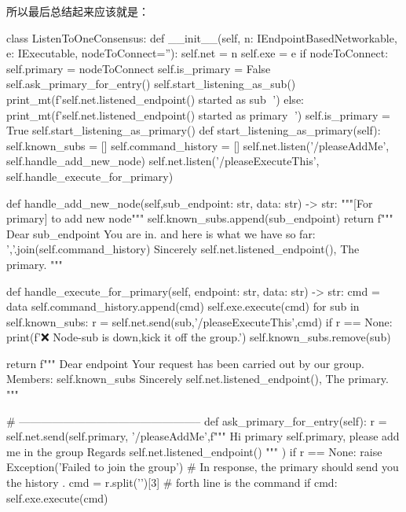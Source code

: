 所以最后总结起来应该就是：
\begin{simplepy}
class ListenToOneConsensus:
    def __init__(self,
                 n: IEndpointBasedNetworkable,
                 e: IExecutable,
                 nodeToConnect=''):
        self.net = n
        self.exe = e
        if nodeToConnect:
            self.primary = nodeToConnect
            self.is_primary = False
            self.ask_primary_for_entry()
            self.start_listening_as_sub()
            print_mt(f'{self.net.listened_endpoint()} started as sub 🐸')
        else:
            print_mt(f'{self.net.listened_endpoint()} started as primary 🐸')
            self.is_primary = True
            self.start_listening_as_primary()
    def start_listening_as_primary(self):
        self.known_subs = []
        self.command_history = []
        self.net.listen('/pleaseAddMe',
                        self.handle_add_new_node)
        self.net.listen('/pleaseExecuteThis',
                        self.handle_execute_for_primary)

    def handle_add_new_node(self,sub_endpoint: str,
                            data: str) -> str:
        """[For primary] to add new node"""
        self.known_subs.append(sub_endpoint)
        return f"""
        Dear {sub_endpoint}
            You are in. and here is what we have so far:
            {','.join(self.command_history)}
                   Sincerely
                   {self.net.listened_endpoint()}, The primary.
        """

    def handle_execute_for_primary(self, endpoint: str,
                                   data: str) -> str:
        cmd = data
        self.command_history.append(cmd)
        self.exe.execute(cmd)
        for sub in self.known_subs:
            r = self.net.send(sub,'/pleaseExecuteThis',cmd)
            if r == None:
                print(f'❌️ Node-{sub} is down,kick it off the group.')
                self.known_subs.remove(sub)

        return f"""
        Dear {endpoint}
             Your request has been carried out by our group.
             Members: {self.known_subs}
                 Sincerely
                 {self.net.listened_endpoint()}, The primary.
        """

    # --------------------------------------------------
    def ask_primary_for_entry(self):
        r = self.net.send(self.primary,
                    '/pleaseAddMe',f"""
                    Hi primary {self.primary},
                       please add me in the group
                          Regards {self.net.listened_endpoint()}
                    """
                          )
        if r == None:
            raise Exception('Failed to join the group')
        # In response, the primary should send you the history .
        cmd = r.split('\n')[3]  # forth line is the command
        if cmd:
            self.exe.execute(cmd)


\end{simplepy}
